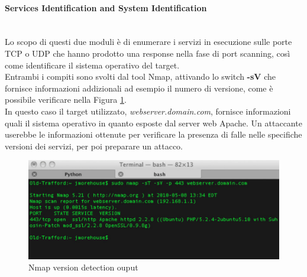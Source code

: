 \paragraph{Services Identification and System Identification}\mbox{}\\
Lo scopo di questi due moduli è di enumerare i servizi in esecuzione sulle porte TCP o UDP che hanno prodotto una response nella fase di port scanning, così come identificare il sistema operativo del target.\\
Entrambi i compiti sono svolti dal tool Nmap, attivando lo switch \textbf{-sV} che fornisce informazioni addizionali ad esempio il numero di versione, come è possibile verificare nella Figura \ref{nmap_sv_img}.\\
In questo caso il target utilizzato, \emph{webserver.domain.com}, fornisce informazioni quali il sistema operativo in quanto esposte dal server web Apache. Un attaccante userebbe le informazioni ottenute per verificare la presenza di falle nelle specifiche versioni dei servizi, per poi preparare un attacco.
\begin{figure}[hbtp]
	\centering
	\includegraphics[scale=.3]{imgs/attack/nmap_sv.png}
	\caption{Nmap version detection ouput}
	\label{nmap_sv_img}
\end{figure}

